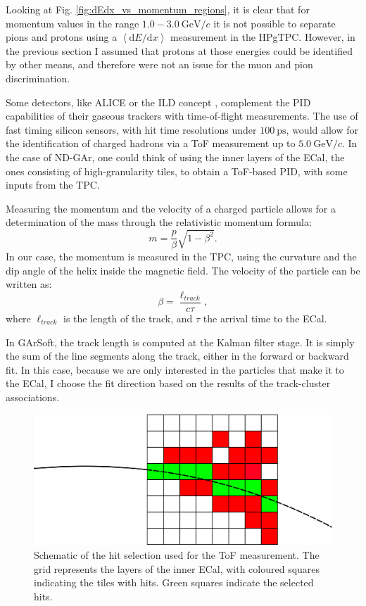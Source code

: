 Looking at Fig. \ref{fig:dEdx_vs_momentum_regions}, it is clear that for momentum values in the range $1.0-3.0 ~ \mathrm{GeV}/c$ it is not possible to separate pions and protons using a $\left<\mathrm{d}E/\mathrm{d}x\right>$ measurement in the HPgTPC. However, in the previous section I assumed that protons at those energies could be identified by other means, and therefore were not an issue for the muon and pion discrimination.

Some detectors, like ALICE \cite{ALICE2011} or the ILD concept \cite{Einhaus2021}, complement the PID capabilities of their gaseous trackers with time-of-flight measurements. The use of fast timing silicon sensors, with hit time resolutions under $100~\mathrm{ps}$, would allow for the identification of charged hadrons via a ToF measurement up to $5.0 ~ \mathrm{GeV}/c$. In the case of ND-GAr, one could think of using the inner layers of the ECal, the ones consisting of high-granularity tiles, to obtain a ToF-based PID, with some inputs from the TPC.

Measuring the momentum and the velocity of a charged particle allows for a determination of the mass through the relativistic momentum formula:
\begin{equation}\label{8.19}
	m = \frac{p}{\beta} \sqrt{1-\beta^{2}}.
\end{equation}
In our case, the momentum is measured in the TPC, using the curvature and the dip angle of the helix inside the magnetic field. The velocity of the particle can be written as:
\begin{equation}
	\beta = \frac{\ell_{track}}{c \tau},
\end{equation}
where $\ell_{track}$ is the length of the track, and $\tau$ the arrival time to the ECal.

In GArSoft, the track length is computed at the Kalman filter stage. It is simply the sum of the line segments along the track, either in the forward or backward fit. In this case, because we are only interested in the particles that make it to the ECal, I choose the fit direction based on the results of the track-cluster associations.

\begin{figure}[t]
	\centering
	\includegraphics[width=.75\linewidth]{Images/GArSoft_PID/tof/tof_diagram.png}
	\caption{Schematic of the hit selection used for the ToF measurement. The grid represents the layers of the inner ECal, with coloured squares indicating the tiles with hits. Green squares indicate the selected hits.}
	\label{fig:tof_diagram}
\end{figure}

